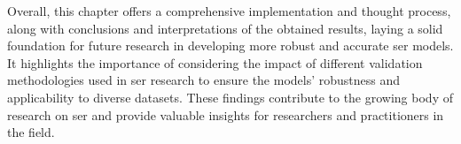 Overall, this chapter offers a comprehensive implementation and thought process, along with conclusions and interpretations of the obtained results, laying a solid foundation for future research in developing more robust and accurate \ac{ser} models. It highlights the importance of considering the impact of different validation methodologies used in \ac{ser} research to ensure the models' robustness and applicability to diverse datasets. These findings contribute to the growing body of research on \ac{ser} and provide valuable insights for researchers and practitioners in the field.
